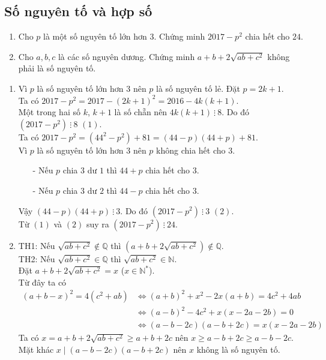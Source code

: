 \subsection{Số nguyên tố và hợp số}
   \begin{ex}
   	\hfill 
   	\begin{enumerate}    
   		\item Cho $p$ là một số nguyên tố lớn hơn $3$. Chứng minh $2017 -p^2$ chia hết cho $24$.
   		\item Cho $a,b,c$ là các số nguyên dương. Chứng minh $a+b+2\sqrt{ab+c^2}$ không phải là số nguyên tố. 
   	\end{enumerate}
   	\loigiai
   	{
   		\begin{enumerate}
   			\item Vì $p$ là số nguyên tố lớn hơn $3$ nên $p$ là số nguyên tố lẻ. Đặt $p=2k+1$. \\
   			Ta có $2017-p^2=2017-(2k+1)^2=2016-4k(k+1)$. \\
   			Một trong hai số $k$, $k+1$ là số chẵn nên $4k(k+1)  \  \vdots \  8$. Do đó $(2017-p^2)  \  \vdots \  8$ $(1)$.
   			\\ Ta có $2017-p^2=(44^2-p^2) +81 =(44-p)(44+p)+81$. 
   			\\ Vì $p$ là số nguyên tố lớn hơn $3$ nên $p$ không chia hết cho $3$.
   			\begin{itemize}
   				\item[-] Nếu $p$ chia $3$ dư $1$ thì $44+p$ chia hết cho $3$.
   				\item[-] Nếu $p$ chia $3$ dư $2$ thì $44-p$ chia hết cho $3$.
   			\end{itemize}
   			Vậy $(44-p)(44+p)  \  \vdots \  3$. Do đó $(2017 -p^2)  \  \vdots \ 3$ $(2)$.
   			\\ Từ $(1)$ và $(2)$ suy ra $(2017-p^2)  \  \vdots \  24$.
   			\item TH1: Nếu $\sqrt{ab+c^2} \not \in \mathbb{Q}$ thì $(a+b+2\sqrt{ab+c^2}) \not \in \mathbb{Q}$.
   			\\ TH2: Nếu $\sqrt{ab+c^2} \in \mathbb{Q}$ thì $\sqrt{ab+c^2} \in \mathbb{N}$.
   			\\ Đặt $a+b+2\sqrt{ab+c^2}=x$ ($x \in \mathbb{N}^*$).
   			\\ Từ đây ta có
   			\begin{align*}
   			(a+b-x)^2=4(c^2+ab) &\Leftrightarrow (a+b)^2+x^2-2x(a+b)=4c^2+4ab \\
   			&\Leftrightarrow (a-b)^2-4c^2 + x(x-2a-2b)=0
   			\\ & \Leftrightarrow (a-b-2c)(a-b+2c)=x(x-2a-2b)
   			\end{align*}
   			Ta có $x=a+b+2\sqrt{ab+c^2} \geq a+b+2c$ nên $x \geq a-b+2c\geq a-b-2c$.
   			\\ Mặt khác $x \mid (a-b-2c)(a-b+2c)$ nên $x$ không là số nguyên tố.
   		\end{enumerate}
   	}
   \end{ex}
